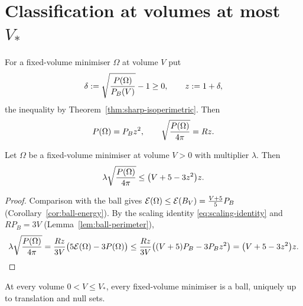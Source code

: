 \chapter{Classification at volumes at most $V_*$}\label{ch:classification}

\begin{notation}\label{not:z-delta}
For a fixed-volume minimiser $\Omega$ at volume $V$ put
\begin{equation}\label{eq:z-delta}
  \delta:=\sqrt{\frac{P(\Omega)}{P_B(V)}}-1\ge0,
  \qquad
  z:=1+\delta ,
\end{equation}
the inequality by Theorem~\ref{thm:sharp-isoperimetric}.  Then
\begin{equation}\label{eq:z-identities}
  P(\Omega)=P_B z^2,
  \qquad
  \sqrt{\frac{P(\Omega)}{4\pi}}=Rz .
\end{equation}
\end{notation}

\begin{lemma}\label{lem:one-ball-upper}
Let $\Omega$ be a fixed-volume minimiser at volume $V>0$ with multiplier
$\lambda$.  Then
\begin{equation}\label{eq:one-ball-upper}
  \lambda\sqrt{\frac{P(\Omega)}{4\pi}}\le\bigl(V+5-3z^2\bigr)z .
\end{equation}
\end{lemma}

\begin{proof}
Comparison with the ball gives
$\mathcal E(\Omega)\le\mathcal E(B_V)=\tfrac{V+5}5P_B$
(Corollary~\ref{cor:ball-energy}).  By the scaling identity
\eqref{eq:scaling-identity} and $RP_B=3V$
(Lemma~\ref{lem:ball-perimeter}),
\[
  \lambda\sqrt{\frac{P(\Omega)}{4\pi}}
  =\frac{Rz}{3V}\bigl(5\mathcal E(\Omega)-3P(\Omega)\bigr)
  \le\frac{Rz}{3V}\bigl((V+5)P_B-3P_Bz^2\bigr)
  =\bigl(V+5-3z^2\bigr)z .
\]
\end{proof}

\begin{proposition}[Classification at $V\le V_*$]\label{prop:classification}
At every volume $0<V\le V_*$, every fixed-volume minimiser is a ball, uniquely
up to translation and null sets.
\end{proposition}

